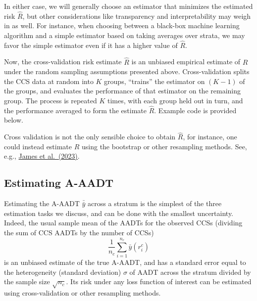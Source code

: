 \documentclass[11pt]{article}
\begin{document}
In either case, we will generally choose an estimator that minimizes the
estimated risk \(\hat{R}\), but other considerations like transparency
and interpretability may weigh in as well. For instance, when choosing
between a black-box machine learning algorithm and a simple estimator
based on taking averages over strata, we may favor the simple estimator
even if it has a higher value of \(\hat{R}\).

Now, the cross-validation risk estimate \(\hat{R}\) is an unbiased
empirical estimate of \(R\) under the random sampling assumptions
presented above. Cross-validation splits the CCS data at random into
\(K\) groups, ``trains'' the estimator on \((K-1)\) of the groups, and
evaluates the performance of that estimator on the remaining group. The
process is repeated \(K\) times, with each group held out in turn, and
the performance averaged to form the estimate \(\hat{R}\). Example code
is provided below.

Cross validation is not the only sensible choice to obtain \(\hat{R}\),
for instance, one could instead estimate \(R\) using the bootstrap or
other resampling methods. See, e.g.,
\href{https://www.statlearning.com/}{James et al.~(2023)}.

    \subsection{Estimating A-AADT}\label{estimating-a-aadt}

Estimating the A-AADT \(\bar{\bar{y}}\) across a stratum is the simplest
of the three estimation tasks we discuss, and can be done with the
smallest uncertainty. Indeed, the usual sample mean of the AADTs for the
observed CCSs (dividing the sum of CCS AADTs by the number of CCSs)
\[\frac{1}{n_c} \sum_{i=1}^{n_c} \bar{y}(r_i^c)\] is an unbiased
estimate of the true A-AADT, and has a standard error equal to the
heterogeneity (standard deviation) \(\sigma\) of AADT across the stratum
divided by the sample size \(\sqrt{n_c}\). Its risk under any loss
function of interest can be estimated using cross-validation or other
resampling methods.
\end{document}
